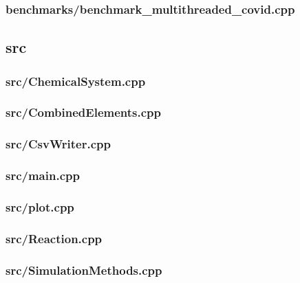 \subsubsection{benchmarks/benchmark\_multithreaded\_covid.cpp}

\newpage
\subsection{src}
\subsubsection{src/ChemicalSystem.cpp}

\newpage
\subsubsection{src/CombinedElements.cpp}

\newpage
\subsubsection{src/CsvWriter.cpp}

\newpage
\subsubsection{src/main.cpp}

\newpage
\subsubsection{src/plot.cpp}

\newpage
\subsubsection{src/Reaction.cpp}

\newpage
\subsubsection{src/SimulationMethods.cpp}

\newpage
